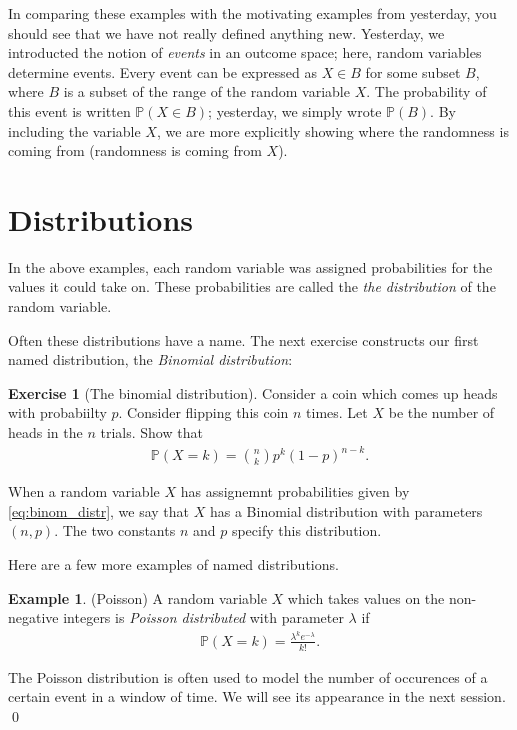 \documentclass[11pt]{article}
\theoremstyle{definition}
\newtheorem{example}[theorem]{Example}
\newtheorem{exercise}[]{Exercise}
\renewcommand{\P}{\mathbb{P}}
\begin{document}
In comparing these examples with the motivating
examples from yesterday, you should see that
we have not really defined anything new.
Yesterday, we introducted the notion of \textit{events}
in an outcome space; here, random variables
determine events.
Every event can be expressed as $X\in B$ for some subset $B$, where
$B$ is a subset of the range of the random variable $X$.
The probability of this event is written
$\P(X\in B)$; yesterday, we simply wrote $\P(B)$.
By including the variable $X$, we are more
explicitly showing where the randomness is coming from
(randomness is coming from $X$).

\section{Distributions}

In the above examples, each random variable was assigned probabilities for
the values it could take on. These probabilities are called the
\textit{the distribution} of the random variable.

Often these distributions have a name. The next exercise constructs our
first named distribution, the \textit{Binomial distribution}:

\begin{exercise}[The binomial distribution]
Consider a coin which comes up heads with probabiilty $p$.
Consider flipping this coin $n$ times. Let $X$ be the number of
heads in the $n$ trials. Show that
\begin{align}
\P(X = k) = {n \choose k} p^k (1 - p)^{n - k}.
\label{eq:binom_distr}
\end{align}

\end{exercise}

When a random variable $X$ has assignemnt probabilities given by \eqref{eq:binom_distr},
we say that $X$ has a Binomial distribution with parameters $(n, p)$. The two constants
$n$ and $p$ specify this distribution.

Here are a few more examples of named distributions.

\begin{example}(Poisson)
A random variable $X$ which takes values on the non-negative integers is
\textit{Poisson distributed} with parameter $\lambda$ if
\begin{align*}
  \P(X = k) = \frac{\lambda^k e^{-\lambda}}{k!}.
\end{align*}

The Poisson distribution is often used to model the number of occurences
of a certain event in a window of time. We will see its appearance in the next session.
\qed
\end{example}
\end{document}
